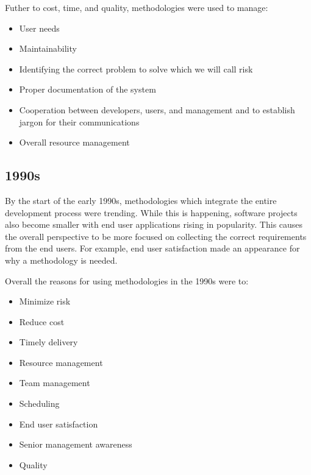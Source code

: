 Futher to cost, time, and quality, methodologies were used to manage:
\begin{itemize}
    \item User needs \cite{peacham_1985}
    \item Maintainability \cite{peacham_1985}
    \item Identifying the correct problem to solve which we will call risk \cite{peacham_1985}
    \item Proper documentation of the system \cite{loesh_1985}
    \item Cooperation between developers, users, and management and to establish jargon for their communications \cite{loesh_1985}
    \item Overall resource management \cite{mannino_1987}
\end{itemize}

\subsection{1990s}
By the start of the early 1990s, methodologies which integrate the entire development process were trending.
While this is happening, software projects also become smaller with end user applications rising in popularity.
This causes the overall perspective to be more focused on collecting the correct requirements \cite{paul_1993} from the end users.
For example, end user satisfaction made an appearance for why a methodology is needed.
\cite{drake_1991}

Overall the reasons for using methodologies in the 1990s were to:
\begin{itemize}
    \item Minimize risk \cite{drake_1991, trussel_1999}
    \item Reduce cost \cite{drake_1991, scarre_1992, paul_1993}
    \item Timely delivery \cite{drake_1991, scarre_1992, herald_1993, trussel_1999}
    \item Resource management \cite{drake_1991}
    \item Team management \cite{drake_1991}
    \item Scheduling \cite{drake_1991, paul_1993}
    \item End user satisfaction \cite{drake_1991}
    \item Senior management awareness \cite{drake_1991}
    \item Quality \cite{drake_1991, scarre_1992, herald_1993, trussel_1999}
\end{itemize}


